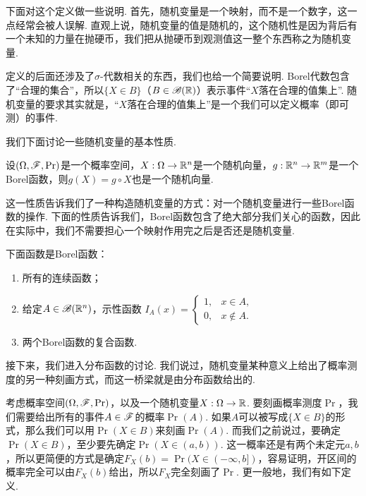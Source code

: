 下面对这个定义做一些说明. 首先，随机变量是一个映射，而不是一个数字，这一点经常会被人误解. 直观上说，随机变量的值是随机的，这个随机性是因为背后有一个未知的力量在抛硬币，我们把从抛硬币到观测值这一整个东西称之为随机变量. 

定义的后面还涉及了$\sigma$-代数相关的东西，我们也给一个简要说明. Borel代数包含了“合理的集合”，所以$\{X\in B\}$（$B\in\mathscr{B}(\mathbb{R})$）表示事件“$X$落在合理的值集上”. 随机变量的要求其实就是，“$X$落在合理的值集上”是一个我们可以定义概率（即可测）的事件. 

我们下面讨论一些随机变量的基本性质. 

\begin{theorem}\label{thm:random-variable}
设$(\Omega,\mathscr{F},\Pr)$是一个概率空间，$X:\Omega\to\mathbb{R}^n$是一个随机向量，$g:\mathbb{R}^n\to\mathbb{R}^m$是一个Borel函数，则$g(X)=g\circ X$也是一个随机向量. 
\end{theorem}

这一性质告诉我们了一种构造随机变量的方式：对一个随机变量进行一些Borel函数的操作. 下面的性质告诉我们，Borel函数包含了绝大部分我们关心的函数，因此在实际中，我们不需要担心一个映射作用完之后是否还是随机变量.

\begin{proposition}\label{prop:borel-function}
下面函数是Borel函数：
\begin{enumerate}
    \item 所有的连续函数；
    \item 给定$A\in\mathscr{B}(\mathbb{R}^n)$，示性函数
    $I_A(x) = \begin{cases}
        1, & x\in A,\\
        0, & x\notin A.
    \end{cases}$
    \item 两个Borel函数的复合函数. 
\end{enumerate}
\end{proposition}



接下来，我们进入分布函数的讨论. 我们说过，随机变量某种意义上给出了概率测度的另一种刻画方式，而这一桥梁就是由分布函数给出的. 

考虑概率空间$(\Omega,\mathscr{F},\Pr)$，以及一个随机变量$X:\Omega\to\mathbb{R}$. 要刻画概率测度$\Pr$，我们需要给出所有的事件$A\in\mathscr{F}$的概率$\Pr(A)$. 如果$A$可以被写成$\{X\in B\}$的形式，那么我们可以用$\Pr(X\in B)$来刻画$\Pr(A)$. 而我们之前说过，要确定$\Pr(X\in B)$，至少要先确定$\Pr(X\in(a,b))$. 这一概率还是有两个未定元$a,b$，所以更简便的方式是确定$F_X(b)=\Pr(X\in(-\infty,b])$，容易证明，开区间的概率完全可以由$F_X(b)$给出，所以$F_X$完全刻画了$\Pr$. 更一般地，我们有如下定义. 

